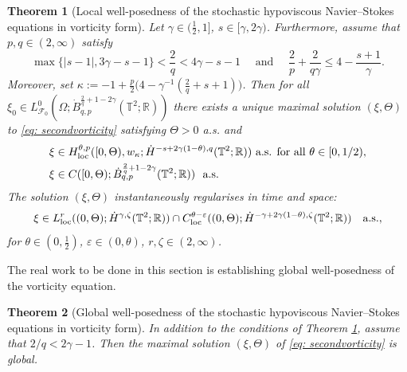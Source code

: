 \documentclass[11pt, a4paper,oneside, reqno]{amsart}
\newtheorem{theorem}{Theorem}
\theoremstyle{remark} %
\theoremstyle{definition} %
\numberwithin{theorem}{section}
\numberwithin{equation}{section}
\def\R{{\mathbb R}}
\newcommand{\Om}{\Omega}
\newcommand{\T}{\mathbb{T}}
\newcommand{\mc}{\mathcal}
\newcommand{\half}{\frac{1}{2}}
\newcommand{\eps}{\varepsilon}
\newcommand{\gam}{\gamma}
\newcommand{\loc}{{\rm loc}}
\begin{document}
\begin{theorem}[Local well-posedness of the stochastic hypoviscous Navier--Stokes equations in vorticity form]\label{thm:localWPvorticity}
    Let $\gam\in (\frac 12,1]$, $s\in [\gam, 2\gam)$. Furthermore, assume that $p,q\in (2,\infty)$ satisfy
      \begin{equation*}
        \max\{|s-1|, 3\gam-s-1\}<\frac 2q < 4\gam-s-1\quad \text{ and }\quad \frac{2}{p}+\frac{2}{q\gam}\leq 4-\frac{s+1}{\gam}.
    \end{equation*}
    Moreover, set $\kappa:=-1 + \frac{p}{2}\big(4-\gam^{-1}(\frac{2}{q}+s+1)\big)$. Then for all $\xi_0 \in L^0_{\mc{F}_0}(\Om; \dot{B}_{q,p}^{\frac{2}{q}+1-2\gam}(\T^2;\R))$ there exists a unique maximal solution $(\xi,\Theta)$ to \eqref{eq: secondvorticity} satisfying $\Theta>0$ a.s. and
    \begin{align*}
        \xi&\in H^{\theta,p}_{\loc}([0,\Theta),w_{\kappa}; \dot{H}^{-s+2\gam(1-\theta),q}(\T^2; \R)) \,\,\text{a.s. for all }\theta\in [0,1/2),\\
        \xi&\in C([0, \Theta); \dot{B}_{q,p}^{\frac{2}{q}+1-2\gam}(\T^2; \R))\,\, \text{ a.s.}
    \end{align*}
    The solution $(\xi,\Theta)$ instantaneously regularises in time and space:
    \begin{equation*}
    \xi\in L^r_\loc((0,\Theta); \dot{H}^{\gam,\zeta}(\T^2;\R))\cap C^{\theta -\eps}_\loc((0,\Theta); \dot{H}^{-\gam+2\gam(1-\theta),\zeta}(\T^2;\R)) \quad \text{a.s.},
\end{equation*}
for $\theta \in (0,\half)$, $\eps\in (0,\theta)$,  $r,\zeta\in (2,\infty)$.
\end{theorem}

The real work to be done in this section is establishing global well-posedness of the vorticity equation. 

\begin{theorem}[Global well-posedness of the stochastic hypoviscous Navier--Stokes equations in vorticity form]\label{thm:globalWPvorticity}
In addition to the conditions of Theorem \ref{thm:localWPvorticity}, assume that $2/q< 2\gam-1$. Then the maximal solution $(\xi,\Theta)$ of \eqref{eq: secondvorticity} is global.
\end{theorem}
\end{document}
